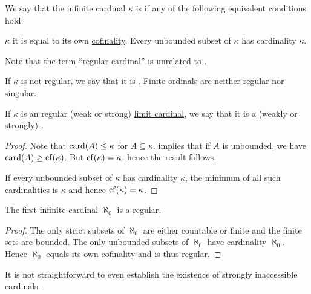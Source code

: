 \begin{definition}\label{def:regular_cardinal}
  We say that the infinite cardinal \( \kappa \) is  if any of the following equivalent conditions hold:
  \begin{thmenum}
     \( \kappa \) it is equal to its own \hyperref[def:cofinality]{cofinality}.
     Every unbounded subset of \( \kappa \) has cardinality \( \kappa \).
  \end{thmenum}

  Note that the term \enquote{regular cardinal} is unrelated to .

  If \( \kappa \) is not regular, we say that it is . Finite ordinals are neither regular nor singular.

  If \( \kappa \) is an  regular (weak or strong) \hyperref[def:successor_and_limit_cardinal]{limit cardinal}, we say that it is a (weakly or strongly) .
\end{definition}
\begin{proof}
   Note that \( \operatorname{card}(A) \leq \kappa \) for \( A \subseteq \kappa \).  implies that if \( A \) is unbounded, we have \( \operatorname{card}(A) \geq \operatorname{cf}(\kappa) \). But \( \operatorname{cf}(\kappa) = \kappa \), hence the result follows.

   If every unbounded subset of \( \kappa \) has cardinality \( \kappa \), the minimum of all such cardinalities is \( \kappa \) and hence \( \operatorname{cf}(\kappa) = \kappa \).
\end{proof}

\begin{proposition}\label{thm:aleph_zero_is_regular}
  The first infinite cardinal \( \aleph_0 \) is a \hyperref[def:regular_cardinal]{regular}.
\end{proposition}
\begin{proof}
  The only strict subsets of \( \aleph_0 \) are either countable or finite and the finite sets are bounded. The only unbounded subsets of \( \aleph_0 \) have cardinality \( \aleph_0 \). Hence \( \aleph_0 \) equals its own cofinality and is thus regular.
\end{proof}

\begin{remark}\label{rem:uncountable_strongly_inaccessible_cardinals}
  It is not straightforward to even establish the existence of strongly inaccessible cardinals.
\end{remark}

